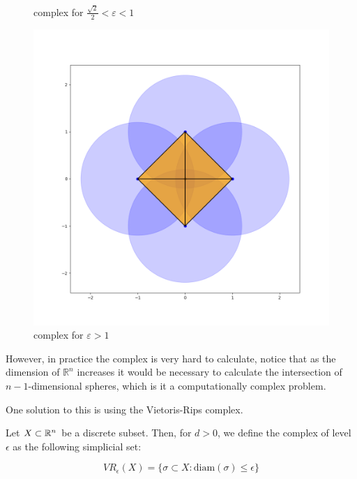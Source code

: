 \begin{figure}[!htb]
  \caption{
  {\Cech} complex for $\frac{\sqrt{2}}{2}<\varepsilon<1$
  }
  \label{fig:awesome_image2}
\endminipage\hfill
{}%
  \includegraphics[width=\linewidth]{imgs/cech_example_1_1_2.png}
  \caption{
  {\Cech} complex for $\varepsilon>1$
  }
  \label{fig:awesome_image3}
\endminipage
\end{figure}


%
%



However, in practice the {\Cech} complex is very hard to calculate,
notice that as the dimension of $\mathbb{R}^n$ increases it would be necessary
to calculate the intersection of $n-1$-dimensional spheres, which is it a
computationally complex problem.

One solution to this is using the 
Vietoris-Rips complex.



\begin{definition}
Let $X\subset \mathbb{R}^n$ be a discrete subset. Then, for $d>0$, we define the \Cech
complex of level $\epsilon$ as the following simplicial set:

$$
VR_\epsilon(X)
=
\{
\sigma \subset X :
\text{diam}(\sigma)\leq \epsilon
\}
$$

\end{definition}

